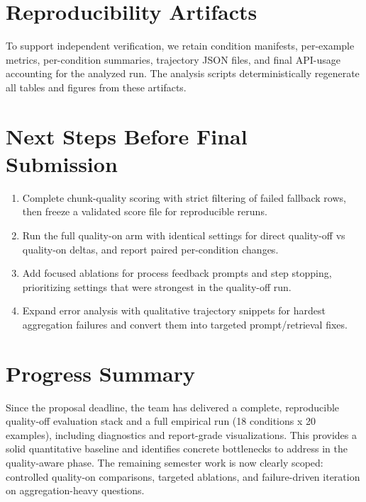\documentclass[11pt]{article}
\begin{document}
\section{Reproducibility Artifacts}
To support independent verification, we retain condition manifests, per-example metrics, per-condition summaries, trajectory JSON files, and final API-usage accounting for the analyzed run. The analysis scripts deterministically regenerate all tables and figures from these artifacts.

\section{Next Steps Before Final Submission}
\begin{enumerate}
    \item Complete chunk-quality scoring with strict filtering of failed fallback rows, then freeze a validated score file for reproducible reruns.
    \item Run the full quality-on arm with identical settings for direct quality-off vs quality-on deltas, and report paired per-condition changes.
    \item Add focused ablations for process feedback prompts and step stopping, prioritizing settings that were strongest in the quality-off run.
    \item Expand error analysis with qualitative trajectory snippets for hardest aggregation failures and convert them into targeted prompt/retrieval fixes.
\end{enumerate}

\section{Progress Summary}
Since the proposal deadline, the team has delivered a complete, reproducible quality-off evaluation stack and a full empirical run (18 conditions x 20 examples), including diagnostics and report-grade visualizations. This provides a solid quantitative baseline and identifies concrete bottlenecks to address in the quality-aware phase. The remaining semester work is now clearly scoped: controlled quality-on comparisons, targeted ablations, and failure-driven iteration on aggregation-heavy questions.
\end{document}
